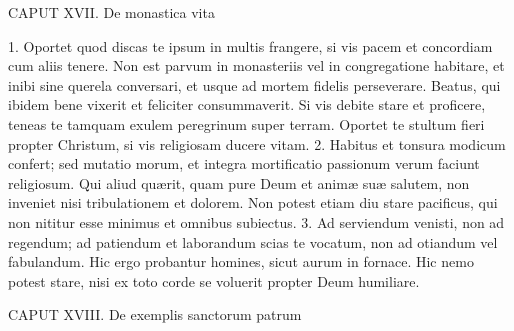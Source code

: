 CAPUT XVII.
De monastica vita

1. Oportet quod discas te ipsum in multis frangere, si vis pacem et concordiam cum aliis tenere. Non est parvum in monasteriis vel in congregatione habitare, et inibi sine querela conversari, et usque ad mortem fidelis perseverare. Beatus, qui ibidem bene vixerit et feliciter consummaverit. Si vis debite stare et proficere, teneas te tamquam exulem peregrinum super terram. Oportet te stultum fieri propter Christum, si vis religiosam ducere vitam.
2. Habitus et tonsura modicum confert; sed mutatio morum, et integra mortificatio passionum verum faciunt religiosum. Qui aliud quærit, quam pure Deum et animæ suæ salutem, non inveniet nisi tribulationem et dolorem. Non potest etiam diu stare pacificus, qui non nititur esse minimus et omnibus subiectus.
3. Ad serviendum venisti, non ad regendum; ad patiendum et laborandum scias te vocatum, non ad otiandum vel fabulandum. Hic ergo probantur homines, sicut aurum in fornace. Hic nemo potest stare, nisi ex toto corde se voluerit propter Deum humiliare.


CAPUT XVIII.
De exemplis sanctorum patrum

